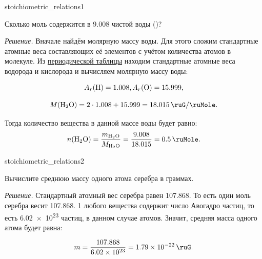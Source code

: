 \begin{example}{}{stoichiometric_relations1}
    \begin{condition}
        Сколько моль содержится в \qty{9,008}{\ruG} чистой воды ()?
    \end{condition}

    \medskip

    \textit{Решение.} Вначале найдём молярную массу воды. Для этого сложим стандартные атомные веса составляющих её элементов с учётом количества атомов в молекуле. Из \hyperref[appendix:periodic_table]{периодической таблицы} находим стандартные атомные веса водорода и кислорода и вычисляем молярную массу воды:

    \begin{equation*}
        A_r(\ce{H}) = \num{1,008}, A_r(\ce{O}) = \num{15,999},
    \end{equation*}

    \begin{equation*}
        M(\ce{H2O}) = 2 \cdot \num{1,008} + \num{15,999} = \qty{18,015}{\ruG\per\ruMole}.
    \end{equation*}

    Тогда количество вещества в данной массе воды будет равно:
    \begin{equation*}
        n(\ce{H2O}) = \frac{m_{\ce{H2O}}}{M_{\ce{H2O}}} = \frac{\num{9,008}}{\num{18,015}} = \qty{0,5}{\ruMole}.
    \end{equation*}
\end{example}

\begin{example}{}{stoichiometric_relations2}
    \begin{condition}
        Вычислите среднюю массу одного атома серебра в граммах.
    \end{condition}

    \medskip

    \textit{Решение.} Стандартный атомный вес серебра равен \num{107,868}. То есть один моль серебра весит \qty{107,868}{\ruG}. \qty{1}{\ruMole} любого вещества содержит число Авогадро частиц, то есть \num{6,02e23} частиц, в данном случае атомов. Значит, средняя масса одного атома будет равна:

    \begin{equation*}
        m = \frac{\num{107,868}}{\num{6,02e23}} = \qty{1,79e-22}{\ruG}.
    \end{equation*}
\end{example}


